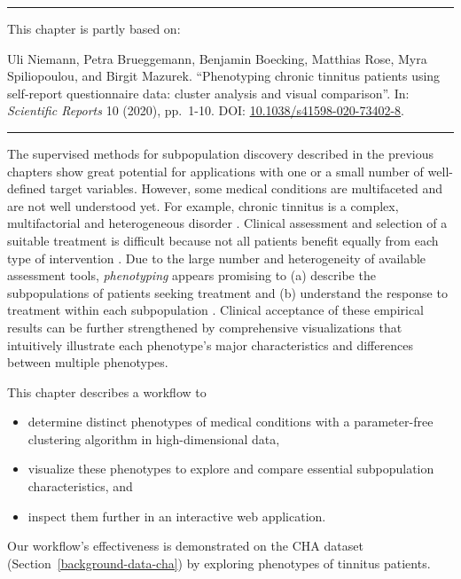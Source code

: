 \documentclass[
  oneside]{book}
\providecommand{\tightlist}{%
  \setlength{\itemsep}{0pt}\setlength{\parskip}{0pt}}
\newenvironment{lit}
  {
  \vspace{8pt}
  \hrule
  \vspace{8pt}
  }
  {
  \vspace{8pt}
  \hrule
  \vspace{8pt}
  }
\begin{document}
\begin{lit}

This chapter is partly based on:

Uli Niemann, Petra Brueggemann, Benjamin Boecking, Matthias Rose, Myra Spiliopoulou, and Birgit Mazurek. ``Phenotyping chronic tinnitus patients using self-report questionnaire data: cluster analysis and visual comparison''. In: \emph{Scientific Reports} 10 (2020), pp.~1-10. DOI: \href{https://doi.org/10.1038\%2Fs41598-020-73402-8}{10.1038/s41598-020-73402-8}.

\end{lit}

The supervised methods for subpopulation discovery described in the previous chapters show great potential for applications with one or a small number of well-defined target variables.
However, some medical conditions are multifaceted and are not well understood yet.
For example, chronic tinnitus is a complex, multifactorial and heterogeneous disorder \autocite{Cederroth2019}.
Clinical assessment and selection of a suitable treatment is difficult because not all patients benefit equally from each type of intervention \autocite{hesse2016evidence,theodoroff2014individual,Tyler:TinnitusClustering2008}.
Due to the large number and heterogeneity of available assessment tools, \emph{phenotyping} appears promising to (a) describe the subpopulations of patients seeking treatment and (b) understand the response to treatment within each subpopulation \autocite{Langguth:LCA2017,Tyler:TinnitusClustering2008,Schecklmann:BrainResearch2012}.
Clinical acceptance of these empirical results can be further strengthened by comprehensive visualizations that intuitively illustrate each phenotype's major characteristics and differences between multiple phenotypes.

This chapter describes a workflow to

\begin{itemize}
\tightlist
\item
  determine distinct phenotypes of medical conditions with a parameter-free clustering algorithm in high-dimensional data,
\item
  visualize these phenotypes to explore and compare essential subpopulation characteristics, and
\item
  inspect them further in an interactive web application.
\end{itemize}

Our workflow's effectiveness is demonstrated on the CHA dataset (Section~\ref{background-data-cha}) by exploring phenotypes of tinnitus patients.
\end{document}
